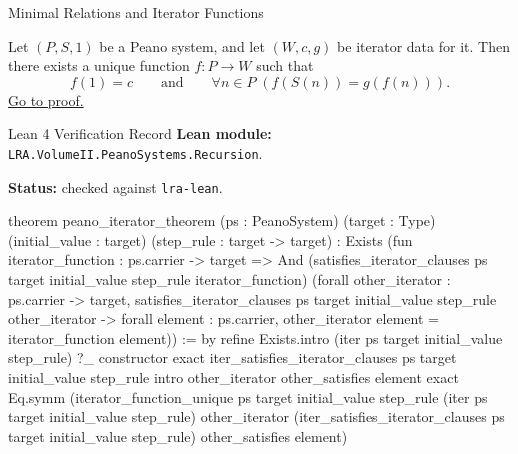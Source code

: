 \begin{topicbox}{Minimal Relations and Iterator Functions}
\begin{tcolorbox}[colback=thmbox, colframe=thmborder, arc=2pt,
  left=6pt, right=6pt, top=4pt, bottom=4pt,
  title={\small\textbf{Theorem (Peano Iterator Theorem)}},
  fonttitle=\small\bfseries]
\begin{theorem}
\label{thm:peano-iterator-theorem}
Let $(P,S,1)$ be a Peano system, and let $(W,c,g)$ be iterator data for it.
Then there exists a unique function $f:P\to W$ such that
\[
f(1)=c
\qquad\text{and}\qquad
\forall n\in P\;(f(S(n))=g(f(n))).
\]
\hyperref[prf:peano-iterator-theorem]{Go to proof.}
\end{theorem}
\end{tcolorbox}

\begin{formalizationrecord}{Lean 4 Verification Record}
\textbf{Lean module:} \texttt{LRA.VolumeII.PeanoSystems.Recursion}.\par
{}
\textbf{Status:} checked against \texttt{lra-lean}.\par

\begin{leancode}
theorem peano_iterator_theorem
    (ps : PeanoSystem)
    (target : Type)
    (initial_value : target)
    (step_rule : target -> target) :
    Exists (fun iterator_function : ps.carrier -> target =>
      And
        (satisfies_iterator_clauses
          ps target initial_value step_rule iterator_function)
        (forall other_iterator : ps.carrier -> target,
          satisfies_iterator_clauses
            ps target initial_value step_rule other_iterator ->
          forall element : ps.carrier,
            other_iterator element = iterator_function element)) := by
  refine
    Exists.intro
      (iter ps target initial_value step_rule)
      ?_
  constructor
  exact iter_satisfies_iterator_clauses ps target initial_value step_rule
  intro other_iterator other_satisfies element
  exact
    Eq.symm
      (iterator_function_unique
        ps target initial_value step_rule
        (iter ps target initial_value step_rule)
        other_iterator
        (iter_satisfies_iterator_clauses ps target initial_value step_rule)
        other_satisfies
        element)
\end{leancode}
\end{formalizationrecord}


\end{topicbox}
